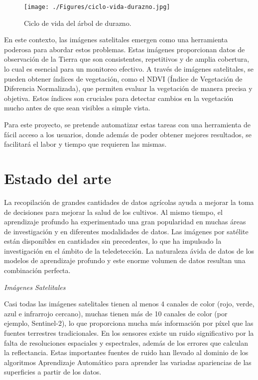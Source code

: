 \vspace{1cm}

\begin{figure}[htbp]
	\centering
	\texttt{[image: ./Figures/ciclo-vida-durazno.jpg]}
  \caption{Ciclo de vida del árbol de durazno\protect\footnotemark.}
	\label{fig:duraznero}
\end{figure}
\vspace{1cm}


En este contexto, las imágenes satelitales emergen como una herramienta poderosa para abordar estos
problemas. Estas imágenes proporcionan datos de observación de la Tierra que son consistentes, 
repetitivos y de amplia cobertura, lo cual es esencial para un monitoreo efectivo. A través de 
imágenes satelitales, se pueden obtener índices de vegetación, como el NDVI (Índice de Vegetación 
de Diferencia Normalizada), que permiten evaluar la vegetación de manera precisa y objetiva.
Estos índices son cruciales para detectar cambios en la vegetación mucho antes de que sean
visibles a simple vista.  

Para este proyecto, se pretende automatizar estas tareas con una herramienta de fácil acceso 
a los usuarios, donde además de poder obtener mejores resultados, se facilitará el labor y 
tiempo que requieren las mismas.


\section{Estado del arte}

La recopilación de grandes cantidades de datos agrícolas ayuda a mejorar la toma de decisiones
para mejorar la salud de los cultivos. Al mismo tiempo, el aprendizaje profundo ha experimentado
una gran popularidad en muchas áreas de investigación y en diferentes modalidades de datos.
Las imágenes por satélite están disponibles en cantidades sin precedentes, lo que ha impulsado
la investigación en el ámbito de la teledetección. La naturaleza ávida de datos de los 
modelos de aprendizaje profundo y este enorme volumen de datos resultan una combinación perfecta.

\textit{Imágenes Satelitales}

Casi todas las imágenes satelitales tienen al menos 4 canales de color (rojo, verde, azul e 
infrarrojo cercano), muchas tienen más de 10 canales de color (por ejemplo, Sentinel-2), 
lo que proporciona mucha más información por píxel que las fuentes terrestres tradicionales. 
En los sensores existe un ruido significativo por la falta de resoluciones espaciales y 
espectrales, además de los errores que calculan la reflectancia. Estas importantes fuentes 
de ruido han llevado al dominio de los algoritmos Aprendizaje Automático para aprender las
variadas apariencias de las superficies a partir de los datos. 

